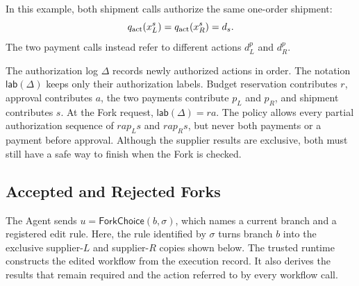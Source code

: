 In this example, both shipment calls authorize the same one-order shipment:
\[
 q_{\rm act}(x_L^s)=q_{\rm act}(x_R^s)=d_s.
\]
The two payment calls instead refer to different actions \(d_L^p\) and \(d_R^p\).

The authorization log \(\Delta\) records newly authorized actions in order.
The notation \(\mathsf{lab}(\Delta)\) keeps only their authorization labels.
Budget reservation contributes \(r\), approval contributes \(a\), the two payments contribute \(p_L\) and \(p_R\), and shipment contributes \(s\).
At the Fork request, \(\mathsf{lab}(\Delta)=ra\).
The policy allows every partial authorization sequence of \(rap_Ls\) and \(rap_Rs\), but never both payments or a payment before approval.
Although the supplier results are exclusive, both must still have a safe way to finish when the Fork is checked.

\subsection{Accepted and Rejected Forks}
The Agent sends \(u=\mathsf{ForkChoice}(b,\sigma)\), which names a current branch and a registered edit rule.
Here, the rule identified by \(\sigma\) turns branch \(b\) into the exclusive supplier-\(L\) and supplier-\(R\) copies shown below.
The trusted runtime constructs the edited workflow from the execution record.
It also derives the results that remain required and the action referred to by every workflow call.

